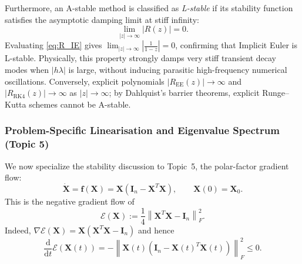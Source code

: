 \documentclass[11pt,a4paper]{article}
\theoremstyle{definition}
\theoremstyle{remark}
\begin{document}
Furthermore, an A-stable method is classified as \emph{L-stable} if its stability function satisfies the asymptotic damping limit at stiff infinity:
\begin{equation}
\label{eq:l_stability_def}
\lim_{|z| \to \infty} |R(z)| = 0.
\end{equation}
Evaluating \eqref{eq:R_IE} gives $\lim_{|z| \to \infty} \left|\frac{1}{1 - z}\right| = 0$, confirming that Implicit Euler is L-stable. Physically, this property strongly damps very stiff transient decay modes when $|h\lambda|$ is large, without inducing parasitic high-frequency numerical oscillations. Conversely, explicit polynomials $|R_{\mathrm{EE}}(z)| \to \infty$ and $|R_{\mathrm{RK4}}(z)| \to \infty$ as $|z| \to \infty$; by Dahlquist's barrier theorems, explicit Runge--Kutta schemes cannot be A-stable.

\subsubsection{Problem-Specific Linearisation and Eigenvalue Spectrum (Topic 5)}
We now specialize the stability discussion to Topic~5, the polar-factor gradient flow:
\begin{equation}
\label{eq:polar_flow_spec}
\dot{\mathbf{X}} = \mathbf{f}(\mathbf{X}) = \mathbf{X}\left(\mathbf{I}_n - \mathbf{X}^T \mathbf{X}\right), \qquad \mathbf{X}(0) = \mathbf{X}_0.
\end{equation}
This is the negative gradient flow of
\begin{equation}
\label{eq:polar_lyapunov}
\mathcal{E}(\mathbf{X}) := \frac14\left\|\mathbf{X}^T\mathbf{X}-\mathbf{I}_n\right\|_F^2.
\end{equation}
Indeed, $\nabla\mathcal{E}(\mathbf{X})=\mathbf{X}(\mathbf{X}^T\mathbf{X}-\mathbf{I}_n)$ and hence
\begin{equation}
\label{eq:polar_lyapunov_decay}
\frac{\mathrm{d}}{\mathrm{d}t}\mathcal{E}(\mathbf{X}(t))
=-\left\|\mathbf{X}(t)\left(\mathbf{I}_n-\mathbf{X}(t)^T\mathbf{X}(t)\right)\right\|_F^2\le 0.
\end{equation}
\end{document}
